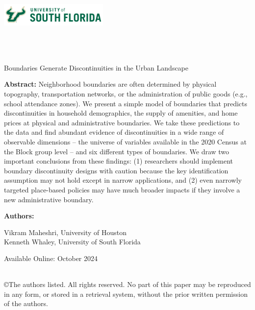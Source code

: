 \documentclass[11pt]{article}
\begin{document}
\onehalfspacing

\noindent \includegraphics[width = 0.4\textwidth]{USouthFlorida-lightbg-2c-rgb-h.png} \\

\noindent{\color{usfgreen} \rule{0.5\textwidth}{10pt}}{\color{usfgold} \rule{0.5\textwidth}{10pt}}\\

 \\
 \\

\vspace*{0.5in}

\begin{center} 
    \huge Boundaries Generate Discontinuities in the Urban Landscape
\end{center}

\vspace*{0.5in}

\noindent \textbf{Abstract:} Neighborhood boundaries are often determined by physical topography, transportation networks, or the administration of public goods (e.g., school attendance zones). We present a simple model of boundaries that predicts discontinuities in household demographics, the supply of amenities, and home prices at physical and administrative boundaries. We take these predictions to the data and find abundant evidence of discontinuities in a wide range of observable dimensions – the universe of variables available in the 2020 Census at the Block group level – and six different types of boundaries. We draw two important conclusions from these findings: (1) researchers should implement boundary discontinuity designs with caution because the key identification assumption may not hold except in narrow applications, and (2) even narrowly targeted place-based policies may have much broader impacts if they involve a new administrative boundary.

\vspace*{0.25in}

\noindent \textbf{Authors:}

Vikram Maheshri, University of Houston \\
\indent Kenneth Whaley, University of South Florida \\

\vspace*{0.25in}


\noindent Available Online: October 2024 %

\vfill 
\noindent{\color{usfgreen} \rule{\textwidth}{5pt}}\\
\noindent \small ©The authors listed. All rights reserved. No part of this paper may be reproduced in any form, or stored in a retrieval system, without the prior written permission of the authors.
\thispagestyle{empty}
\end{document}
